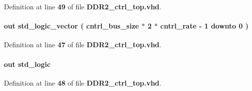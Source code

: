 Definition at line {\bf 49} of file {\bf D\+D\+R2\+\_\+ctrl\+\_\+top.\+vhd}.

\paragraph[{local\+\_\+rdata}]{ {\bfseries \textcolor{keywordflow}{out}\textcolor{vhdlchar}{ }} {\bfseries \textcolor{comment}{std\+\_\+logic\+\_\+vector}\textcolor{vhdlchar}{ }\textcolor{vhdlchar}{(}\textcolor{vhdlchar}{ }\textcolor{vhdlchar}{ }\textcolor{vhdlchar}{ }\textcolor{vhdlchar}{ }{\bfseries {\bf cntrl\+\_\+bus\+\_\+size}} \textcolor{vhdlchar}{$\ast$}\textcolor{vhdlchar}{ } \textcolor{vhdldigit}{2} \textcolor{vhdlchar}{$\ast$}\textcolor{vhdlchar}{ }\textcolor{vhdlchar}{ }\textcolor{vhdlchar}{ }{\bfseries {\bf cntrl\+\_\+rate}} \textcolor{vhdlchar}{-\/}\textcolor{vhdlchar}{ } \textcolor{vhdldigit}{1} \textcolor{vhdlchar}{ }\textcolor{keywordflow}{downto}\textcolor{vhdlchar}{ }\textcolor{vhdlchar}{ } \textcolor{vhdldigit}{0} \textcolor{vhdlchar}{ }\textcolor{vhdlchar}{)}\textcolor{vhdlchar}{ }} \hspace{0.3cm}{\ttfamily [Port]}}\label{classDDR2__ctrl__top_ac441d3111780e06a42c6ddc3f39b83b2}


Definition at line {\bf 47} of file {\bf D\+D\+R2\+\_\+ctrl\+\_\+top.\+vhd}.

\paragraph[{local\+\_\+rdata\+\_\+valid}]{ {\bfseries \textcolor{keywordflow}{out}\textcolor{vhdlchar}{ }} {\bfseries \textcolor{comment}{std\+\_\+logic}\textcolor{vhdlchar}{ }} \hspace{0.3cm}{\ttfamily [Port]}}\label{classDDR2__ctrl__top_ab8cca8f9bf01ca45e7cb7ecbc2725c53}


Definition at line {\bf 48} of file {\bf D\+D\+R2\+\_\+ctrl\+\_\+top.\+vhd}.

